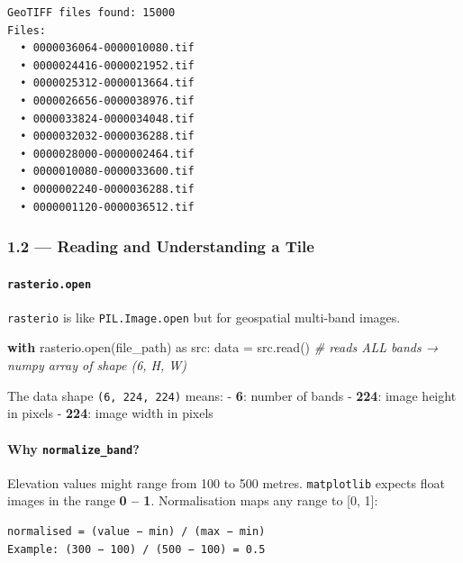 \documentclass[11pt]{article}
\newenvironment{Shaded}{}{}
\newcommand{\CommentTok}[1]{\textcolor[rgb]{0.38,0.63,0.69}{\textit{{#1}}}}
\newcommand{\NormalTok}[1]{{#1}}
\newcommand{\ImportTok}[1]{{#1}}
\newcommand{\ControlFlowTok}[1]{\textcolor[rgb]{0.00,0.44,0.13}{\textbf{{#1}}}}
\newcommand{\OperatorTok}[1]{\textcolor[rgb]{0.40,0.40,0.40}{{#1}}}
\newcommand{\BuiltInTok}[1]{{#1}}
\begin{document}
    \begin{Verbatim}[commandchars=\\\{\}]
GeoTIFF files found: 15000
Files:
  • 0000036064-0000010080.tif
  • 0000024416-0000021952.tif
  • 0000025312-0000013664.tif
  • 0000026656-0000038976.tif
  • 0000033824-0000034048.tif
  • 0000032032-0000036288.tif
  • 0000028000-0000002464.tif
  • 0000010080-0000033600.tif
  • 0000002240-0000036288.tif
  • 0000001120-0000036512.tif
    \end{Verbatim}

    \subsubsection{1.2 --- Reading and Understanding a
Tile}\label{reading-and-understanding-a-tile}

\paragraph{\texorpdfstring{\texttt{rasterio.open}}{rasterio.open}}\label{rasterio.open}

\texttt{rasterio} is like \texttt{PIL.Image.open} but for geospatial
multi-band images.

\begin{Shaded}
\begin{Highlighting}[]
\ControlFlowTok{with}\NormalTok{ rasterio.}\BuiltInTok{open}\NormalTok{(file\_path) }\ImportTok{as}\NormalTok{ src:}
\NormalTok{    data }\OperatorTok{=}\NormalTok{ src.read()  }\CommentTok{\# reads ALL bands → numpy array of shape (6, H, W)}
\end{Highlighting}
\end{Shaded}

The data shape \texttt{(6,\ 224,\ 224)} means: - \textbf{6}: number of
bands - \textbf{224}: image height in pixels - \textbf{224}: image width
in pixels

\paragraph{\texorpdfstring{Why
\texttt{normalize\_band}?}{Why normalize\_band?}}\label{why-normalize_band}

Elevation values might range from 100 to 500 metres. \texttt{matplotlib}
expects float images in the range \textbf{0 -- 1}. Normalisation maps
any range to {[}0, 1{]}:

\begin{verbatim}
normalised = (value − min) / (max − min)
Example: (300 − 100) / (500 − 100) = 0.5
\end{verbatim}
\end{document}
